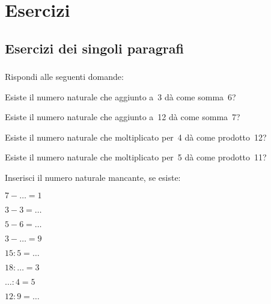 
\section{Esercizi}

\subsection{Esercizi dei singoli paragrafi}

\subsubsection*{}

\begin{esercizio}
\label{ese:1.1}
Rispondi alle seguenti domande:
 \begin{enumeratea}
 \item Esiste il numero naturale che aggiunto a~3 dà come somma~6?
 \item Esiste il numero naturale che aggiunto a~12 dà come somma~7?
 \item Esiste il numero naturale che moltiplicato per~4 dà come prodotto~12?
 \item Esiste il numero naturale che moltiplicato per~5 dà come prodotto~11?
 \end{enumeratea}
\end{esercizio}

\begin{esercizio}
\label{ese:1.2}
 Inserisci il numero naturale mancante, se esiste:
\begin{multicols}{4}
\begin{enumeratea}
 \item $7-\ldots =1$
 \item$3-3=\ldots~$
 \item$5-6=\ldots~$
 \item $3-\ldots =9$
 \item$15:5=\ldots~$
 \item$18:\ldots =3$
 \item $\ldots:4=5$
 \item$12:9=\ldots~$
\end{enumeratea}
\end{multicols}
\end{esercizio}

